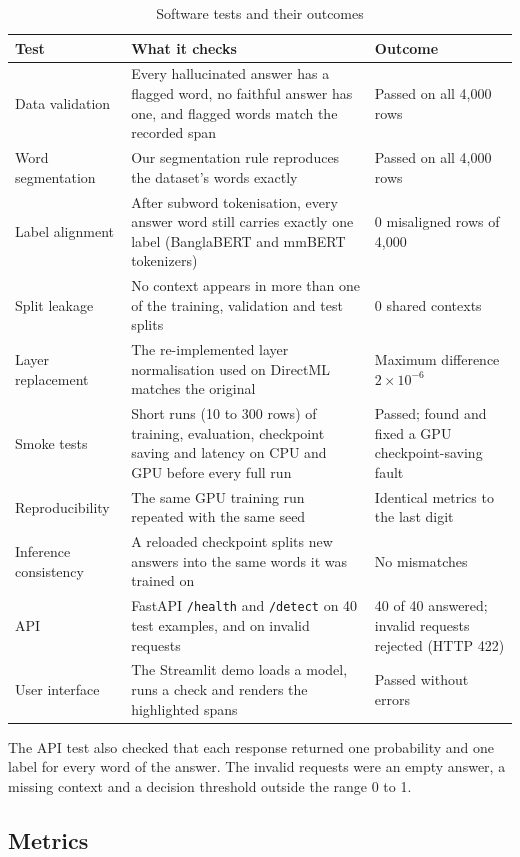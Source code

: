 \begin{table}[htbp]
\centering
\small
\caption{Software tests and their outcomes}
\label{tab:tests}
\begin{tabular}{p{3.3cm}p{6.2cm}p{4.0cm}}
\hline
\textbf{Test} & \textbf{What it checks} & \textbf{Outcome} \\
\hline
Data validation & Every hallucinated answer has a flagged word, no faithful answer has one, and flagged words match the recorded span & Passed on all 4,000 rows \\
Word segmentation & Our segmentation rule reproduces the dataset's words exactly & Passed on all 4,000 rows \\
Label alignment & After subword tokenisation, every answer word still carries exactly one label (BanglaBERT and mmBERT tokenizers) & 0 misaligned rows of 4,000 \\
Split leakage & No context appears in more than one of the training, validation and test splits & 0 shared contexts \\
Layer replacement & The re-implemented layer normalisation used on DirectML matches the original & Maximum difference $2\times10^{-6}$ \\
Smoke tests & Short runs (10 to 300 rows) of training, evaluation, checkpoint saving and latency on CPU and GPU before every full run & Passed; found and fixed a GPU checkpoint-saving fault \\
Reproducibility & The same GPU training run repeated with the same seed & Identical metrics to the last digit \\
Inference consistency & A reloaded checkpoint splits new answers into the same words it was trained on & No mismatches \\
API & FastAPI \texttt{/health} and \texttt{/detect} on 40 test examples, and on invalid requests & 40 of 40 answered; invalid requests rejected (HTTP 422) \\
User interface & The Streamlit demo loads a model, runs a check and renders the highlighted spans & Passed without errors \\
\hline
\end{tabular}
\end{table}

The API test also checked that each response returned one probability and one
label for every word of the answer. The invalid requests were an empty answer,
a missing context and a decision threshold outside the range 0 to 1.

\subsection{Metrics}

